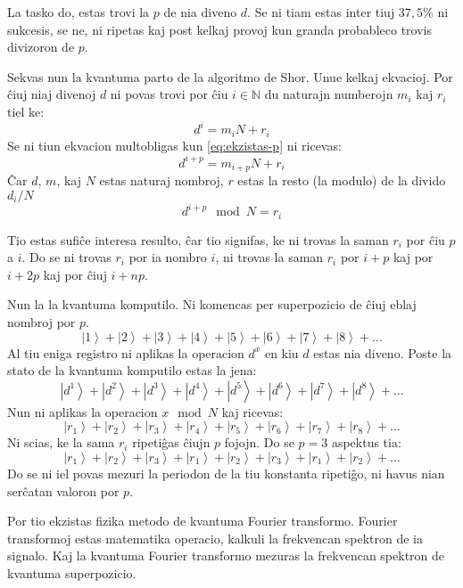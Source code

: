 \documentclass[utf8]{scrartcl}
\begin{document}
La tasko do, estas trovi la $p$ de nia diveno $d$. Se ni tiam estas inter tiuj
$37,5 \%$ ni sukcesis, se ne, ni ripetas kaj post kelkaj provoj kun granda
probableco trovis divizoron de $p$.

Sekvas nun la kvantuma parto de la algoritmo de Shor. Unue kelkaj ekvacioj. Por
ĉiuj niaj divenoj $d$ ni povas trovi por ĉiu $i\in\mathbb{N}$ du naturajn
numberojn $m_i$ kaj $r_i$ tiel ke:
\begin{equation}
  \label{eq:di-rilato}
  d^i = m_i N + r_i
\end{equation}
%
Se ni tiun ekvacion multobligas kun \eqref{eq:ekzistas-p} ni ricevas:
\begin{equation}
  \label{eq:di-p-rilato}
  d^{i+p} = m_{i+p} N + r_i
\end{equation}
%
Ĉar $d$, $m$, kaj $N$ estas naturaj nombroj, $r$ estas la resto (la modulo) de
la divido $d_i/N$
\begin{equation}
  \label{eq:di-mod-ri}
  d^{i+p}\mod N = r_i
\end{equation}

Tio estas sufiĉe interesa resulto, ĉar tio signifas, ke ni trovas la saman
$r_i$ por ĉiu $p$a $i$. Do se ni trovas $r_i$ por ia nombro $i$, ni trovas la
saman $r_i$ por $i + p$ kaj por $i + 2p$ kaj por ĉiuj $i + np$.

Nun la la kvantuma komputilo. Ni komencas per superpozicio de ĉiuj eblaj
nombroj por $p$.
\[\left|1\right> + \left|2\right> + \left|3\right> + \left|4\right> +
  \left|5\right> + \left|6\right> + \left|7\right> + \left|8\right> + \ldots \]
%
Al tiu eniga registro ni aplikas la operacion $d^x$ en kiu $d$ estas nia
diveno. Poste la stato de la kvantuma komputilo estas la jena:
\[\left|d^1\right> + \left|d^2\right> + \left|d^3\right> + \left|d^4\right> +
  \left|d^5\right> + \left|d^6\right> + \left|d^7\right> + \left|d^8\right> +
  \ldots\]
%
Nun ni aplikas la operacion $x\mod N$ kaj ricevas:
\[\left|r_1\right> + \left|r_2\right> + \left|r_3\right> + \left|r_4\right> +
  \left|r_5\right> + \left|r_6\right> + \left|r_7\right> + \left|r_8\right> +
  \ldots\]
%
Ni scias, ke la sama $r_i$ ripetiĝas ĉiujn $p$ fojojn. Do se $p=3$ aspektus
tia:
\[\left|r_1\right> + \left|r_2\right> + \left|r_3\right> + \left|r_1\right> +
  \left|r_2\right> + \left|r_3\right> + \left|r_1\right> + \left|r_2\right> +
  \ldots\]
%
Do se ni iel povas mezuri la periodon de la tiu konstanta ripetiĝo, ni havus
nian serĉatan valoron por $p$.

Por tio ekzistas fizika metodo de kvantuma Fourier transformo. Fourier
transformoj estas matematika operacio, kalkuli la frekvencan spektron de ia
signalo. Kaj la kvantuma Fourier transformo mezuras la frekvencan spektron de
kvantuma superpozicio.
\end{document}
